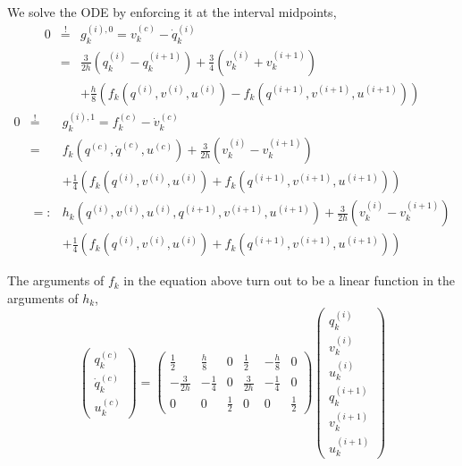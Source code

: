\documentclass[a4paper]{article}
\begin{document}
We solve the ODE by enforcing it at the interval midpoints,
\begin{eqnarray}
0 &\stackrel{!}{=}& g_k^{(i),0} = v_k^{(c)} - \dot{q}_k^{(i)}\\
&=& \frac{3}{2h} \left( q_k^{(i)} - q_k^{(i+1)} \right)
+ \frac{3}{4}\left( v_k^{(i)} + v_k^{(i+1)} \right)\nonumber \\
&&+ \frac{h}{8}\left( f_k(q^{(i)}, v^{(i)}, u^{(i)}) - f_k(q^{(i+1)}, v^{(i+1)}, u^{(i+1)}) \right)\nonumber
\end{eqnarray}
\begin{eqnarray}
0 &\stackrel{!}{=}& g_k^{(i),1} = f_k^{(c)} - \dot{v}_k^{(c)}\\
&=& f_k(q^{(c)}, \dot{q}^{(c)}, u^{(c)}) + \frac{3}{2h} \left( v_k^{(i)} - v_k^{(i+1)} \right) \nonumber \\
&& + \frac{1}{4} \left( f_k(q^{(i)}, v^{(i)}, u^{(i)}) + f_k(q^{(i+1)}, v^{(i+1)}, u^{(i+1)}) \right) \nonumber\\
&=:& h_k(q^{(i)}, v^{(i)}, u^{(i)}, q^{(i+1)}, v^{(i+1)}, u^{(i+1)}) + \frac{3}{2h} \left( v_k^{(i)} - v_k^{(i+1)} \right) \nonumber \\
&& + \frac{1}{4} \left( f_k(q^{(i)}, v^{(i)}, u^{(i)}) + f_k(q^{(i+1)}, v^{(i+1)}, u^{(i+1)}) \right) \nonumber
\end{eqnarray}

The arguments of $f_k$ in the equation above turn out to be a linear function in the arguments of $h_k$,
\begin{equation}
\left( \begin{array}{c} q_k^{(c)}\\ \dot{q}_k^{(c)}\\ u_k^{(c)} \end{array} \right) =
\left( \begin{array}{cccccc}
\frac{1}{2} & \frac{h}{8} & 0 & \frac{1}{2} & -\frac{h}{8} & 0\\
-\frac{3}{2h} & -\frac{1}{4} & 0 & \frac{3}{2h} & -\frac{1}{4} & 0\\
0 & 0 & \frac{1}{2} & 0 & 0 & \frac{1}{2}
\end{array} \right)
\left( \begin{array}{c}
q_k^{(i)}\\ v_k^{(i)}\\ u_k^{(i)}\\ q_k^{(i+1)}\\ v_k^{(i+1)}\\ u_k^{(i+1)}
\end{array} \right)
\end{equation}
\end{document}
